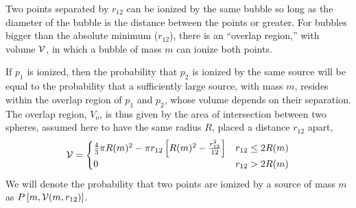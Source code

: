 Two points separated by $r_{12}$ can be ionized by the same bubble so long as the diameter of the bubble is the distance between the points or greater. For bubbles bigger than the absolute minimum ($r_{12}$), there is an ``overlap region,'' with volume $\mathcal{V}$, in which a bubble of mass $m$ can ionize both points.

If $p_1$ is ionized, then the probability that $p_2$ is ionized by the same source will be equal to the probability that a sufficiently large source, with mass $m$, resides within the overlap region of $p_1$ and $p_2$, whose volume depends on their separation. The overlap region, $V_o$, is thus given by the area of intersection between two spheres, assumed here to have the same radius $R$, placed a distance $r_{12}$ apart,
\begin{equation}
  \mathcal{V} = 
  \begin{cases}
    \frac{4}{3}\pi R(m)^2 - \pi r_{12} \left[R(m)^2 - \frac{r_{12}^2}{12} \right] & r_{12} \leq 2 R(m) \\
    0 & r_{12} > 2 R(m)
  \end{cases}
  \label{eq:V_overlap}
\end{equation}
We will denote the probability that two points are ionized by a source of mass $m$ as $P\left[m,\mathcal{V}(m,r_{12})\right]$.

